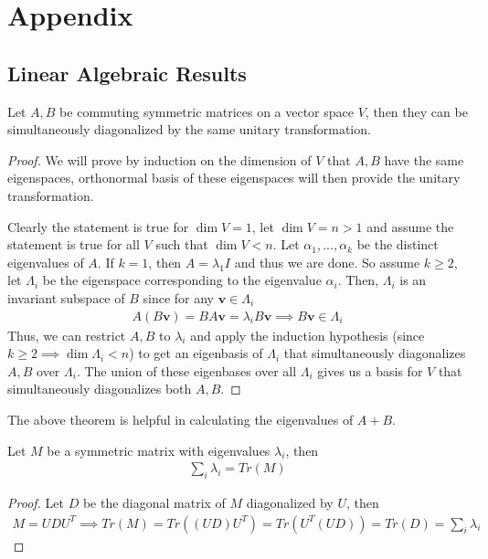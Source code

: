 \documentclass{math}
\renewcommand{\vec}[1]{\boldsymbol{#1}}
\begin{document}
\section{Appendix}

\subsection{Linear Algebraic Results}

\begin{theorem}
    Let $A, B$ be commuting symmetric matrices on a vector space $V$, then they can be simultaneously diagonalized by the same unitary transformation.
\end{theorem}
\begin{proof}
    We will prove by induction on the dimension of $V$ that $A, B$ have the same eigenspaces,
    orthonormal basis of these eigenspaces will then provide the unitary transformation.

    Clearly the statement is true for $\dim V = 1$, let $\dim V = n > 1$ and assume the statement is true for all $V$ such that $\dim V < n$.
    Let $\alpha_1, ..., \alpha_k$ be the distinct eigenvalues of $A$. If $k = 1$, then $A = \lambda_1 I$ and thus we are done.
    So assume $k \geq 2$, let $\Lambda_i$ be the eigenspace corresponding to the eigenvalue $\alpha_i$.
    Then, $\Lambda_i$ is an invariant subspace of $B$ since for any $\vec{v} \in \Lambda_i$
    \begin{align*}
        A(B\vec{v}) = BA\vec{v} = \lambda_i B \vec{v} \implies B\vec{v} \in \Lambda_i
    \end{align*}
    Thus, we can restrict $A, B$ to $\lambda_i$ and apply the induction hypothesis (since $k \geq 2 \implies \dim \Lambda_i < n$)
    to get an eigenbasis of $\Lambda_i$ that simultaneously diagonalizes $A, B$ over $\Lambda_i$. The union of these eigenbases over all $\Lambda_i$ gives us a basis for $V$
    that simultaneously diagonalizes both $A, B$.
\end{proof}

The above theorem is helpful in calculating the eigenvalues of $A + B$.

\begin{theorem}
    Let $M$ be a symmetric matrix with eigenvalues $\lambda_i$, then
    \begin{align*}
        \sum_i \lambda_i = Tr(M)
    \end{align*}
\end{theorem}
\begin{proof}
    Let $D$ be the diagonal matrix of $M$ diagonalized by $U$, then
    \begin{align*}
        M = UDU^T \implies Tr(M) = Tr((UD)U^T) = Tr(U^T (UD)) = Tr(D) = \sum_i \lambda_i
    \end{align*}
\end{proof}
\end{document}
